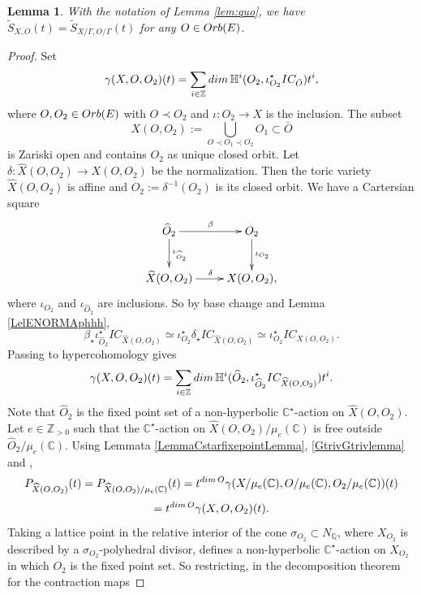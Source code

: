 \documentclass[11pt, reqno]{amsart}
\theoremstyle{plain}
\newtheorem{lemma}[theorem]{Lemma}
\theoremstyle{definition}
\theoremstyle{remark}
\begin{document}
\begin{lemma}\label{LemmaStildeL}
With the notation of Lemma \ref{lem:quo}, we have $\widetilde{S}_{X, O}(t) =  \widetilde{S}_{X/\Gamma, O/\Gamma}(t)$ for any $O\in {\rm Orb}(E)$.
\end{lemma}
\begin{proof}
 Set 
$$\gamma(X, O, O_{2})(t) = \sum_{i\in \mathbb{Z}}{\rm dim}\, \mathbb{H}^{i}(O_{2}, \iota_{O_{2}}^{\star}IC_{\bar{O}})t^{i},$$
where $O,O_{2}\in {\rm Orb}(E)$ with $O\prec O_{2}$  and $\iota: O_{2}\rightarrow X$ is the inclusion. The subset 
$$X(O, O_{2}):= \bigcup_{O\prec O_{1}\prec O_{2}}O_{1}\subset \bar{O}$$
is  Zariski open and contains $O_{2}$ as unique closed orbit. Let $\delta: \widehat{X}(O, O_{2})\rightarrow X(O, O_{2})$ be the normalization. Then the toric variety $\widehat{X}(O, O_{2})$ is affine and $\widehat{O}_{2}:= \delta^{-1}(O_{2})$
is its closed orbit. We have a Cartersian square  
 $$\xymatrix{
      \widehat{O}_{2}\ar[r]^{\beta} \ar[d] ^{\iota_{\widehat{O}_{2}}} & O_{2}\ar[d]^{\iota_{O_{2}}}\\ \widehat{X}(O, O_{2}) \ar[r]^{\delta} & X(O, O_{2}), }$$ 
where $\iota_{O_{2}}$ and $\iota_{\widehat{O}_{2}}$ are inclusions. So by base change \cite[Theorem 2.3.26]{Dim04} and Lemma \ref{LelENORMAphhh},
$$\beta_{\star}\iota_{\widehat{O}_{2}}^{\star} IC_{\widehat{X}(O, O_{2})}\simeq \iota_{O_{2}}^{\star}\delta_{\star} IC_{\widehat{X}(O, O_{2})}\simeq \iota_{O_{2}}^{\star} IC_{X(O, O_{2})}.$$
Passing to hypercohomology gives
$$\gamma(X, O, O_{2})(t)  =   \sum_{i\in \mathbb{Z}}{\rm dim}\, \mathbb{H}^{i}(\widehat{O}_{2}, \iota_{\widehat{O}_{2}}^{\star}IC_{\widehat{X}(O, O_{2})})t^{i}.$$
Note that $\widehat{O}_{2}$ is the fixed point set of a non-hyperbolic $\mathbb{C}^{\star}$-action on $\widehat{X}(O, O_{2})$. Let $e\in \mathbb{Z}_{>0}$ such that the $\mathbb{C}^{\star}$-action on $\widehat{X}(O, O_{2})/\mu_{e}(\mathbb{C})$ is free outside $\widehat{O}_{2}/\mu_{e}(\mathbb{C})$. Using Lemmata \ref{LemmaCstarfixepointLemma},  \ref{GtrivGtrivlemma} and \cite[Theorems 10, 11]{BM99},
$$P_{\widehat{X}(O, O_{2})}(t) = P_{\widehat{X}(O, O_{2})/\mu_{e}(\mathbb{C})}(t) =   t^{{\rm dim}\, O} \gamma(X/\mu_{e}(\mathbb{C}), O/\mu_{e}(\mathbb{C}), O_{2}/\mu_{e}(\mathbb{C}))(t) $$
$$=   t^{{\rm dim}\, O}\gamma(X, O, O_{2})(t).$$
Taking a lattice point in the relative interior of the cone $\sigma_{O_{2}}\subset N_{\mathbb{Q}}$,
where $X_{O_{2}}$ is described by a $\sigma_{O_{2}}$-polyhedral divisor, defines  a non-hyperbolic $\mathbb{C}^{\star}$-action on $X_{O_{2}}$ in which  $O_{2}$ is the fixed point set. So restricting, in the decomposition theorem for the contraction maps

\end{proof}
\end{document}
